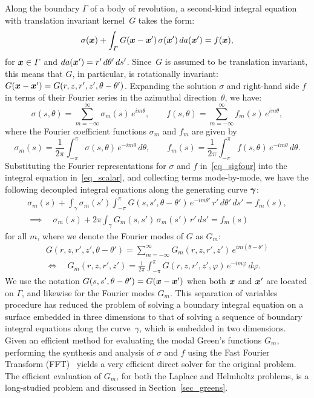 \documentclass[11pt]{article}
\renewcommand{\phi}{\varphi}
\newcommand{\vct}{\vectorsym}
\newcommand{\bx}{\vct{ x}}
\numberwithin{equation}{section}
\begin{document}
Along the boundary $\Gamma$ of a body of revolution, a second-kind
integral equation with translation invariant 
kernel~$G$  takes the form:
\begin{equation}\label{eq_scalar}
\sigma(\bx) + \int_\Gamma G(\bx - \bx') \, \sigma(\bx') \, da(\bx')
 = f(\bx),
\end{equation}
for $\bx \in \Gamma$ and $da(\bx') = r' \, d\theta' \, ds'$.
Since~$G$ is assumed to be translation invariant,
this means that $G$, in particular, is rotationally
invariant: $G(\bx-\bx') = G(r,z,r',z',\theta-\theta')$.
Expanding the solution
$\sigma$ and right-hand side $f$ in terms of their Fourier series in
the azimuthal direction~$\theta$, we
have:
\begin{equation}\label{eq_sigfour}
\sigma(s,\theta) = \sum_{m=-\infty}^{\infty} \sigma_m(s) \,
e^{im\theta}, \qquad 
f(s,\theta) = \sum_{m=-\infty}^{\infty} f_m(s) \, e^{im\theta},
\end{equation}
where the Fourier coefficient functions $\sigma_m$ and $f_m$ are given
by
\begin{equation}
\sigma_m(s) = \frac{1}{2\pi} \int_{-\pi}^\pi \sigma(s,\theta) \,
e^{-im\theta} \, d\theta, \qquad 
f_m(s) = \frac{1}{2\pi} \int_{-\pi}^\pi f(s,\theta) \,
e^{-im\theta} \, d\theta.
\end{equation}
Substituting the Fourier representations for $\sigma$ and $f$
in~\eqref{eq_sigfour} into the integral equation in~\eqref{eq_scalar},
and collecting terms mode-by-mode, we have the following decoupled
integral equations along the generating curve $\vct{\gamma}$:
\begin{multline}
  \sigma_m(s) + \int_\gamma \sigma_m(s') \int_{-\pi}^\pi G(s,s',\theta-\theta')
  \, e^{-im\theta'} \, r' \, d\theta' \, ds' = f_m(s), \\
  \implies \quad \sigma_m(s) + 2\pi \int_\gamma G_m(s,s') \, \sigma_m(s') \,
  r' \, ds' = f_m(s)
\end{multline}
for all $m$, where we denote the Fourier modes of $G$ as $G_m$:
\begin{multline}
G(r,z,r',z',\theta-\theta') = \sum_{m=-\infty}^\infty G_m(r,z,r',z')
\, e^{im(\theta-\theta')} \\  \iff \quad G_m(r,z,r',z') =
  \frac{1}{2\pi}
  \int_{-\pi}^\pi G(r,z,r',z',\phi) \, e^{-im\phi} \, d\phi.
\end{multline}
We use the notation $G(s,s',\theta-\theta') = G(\bx-\bx')$  when
both $\bx$ and $\bx'$ are located on $\Gamma$, and likewise for the
Fourier modes $G_m$.
This separation of variables
procedure has reduced the problem of solving a boundary integral
equation on a surface embedded in three dimensions to that of solving
a sequence of boundary integral equations along the curve~$\gamma$,
which is embedded in two
dimensions. Given an efficient method for evaluating the modal Green's
functions $G_m$, performing the synthesis and analysis of $\sigma$ and
$f$ using the Fast Fourier Transform (FFT)~\cite{briggs_1995} yields a
very efficient direct solver for the original problem. 
The efficient
evaluation of $G_m$, for both the Laplace and Helmholtz problems, 
is a long-studied problem and discussed in Section~\ref{sec_greens}.
\end{document}
